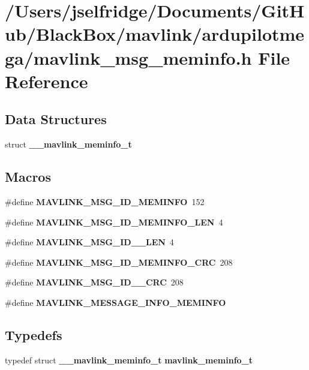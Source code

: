 \section{/\+Users/jselfridge/\+Documents/\+Git\+Hub/\+Black\+Box/mavlink/ardupilotmega/mavlink\+\_\+msg\+\_\+meminfo.h File Reference}
\label{mavlink__msg__meminfo_8h}
\subsection*{Data Structures}
\begin{DoxyCompactItemize}
\item 
struct \textbf{ \+\_\+\+\_\+mavlink\+\_\+meminfo\+\_\+t}
\end{DoxyCompactItemize}
\subsection*{Macros}
\begin{DoxyCompactItemize}
\item 
\#define \textbf{ M\+A\+V\+L\+I\+N\+K\+\_\+\+M\+S\+G\+\_\+\+I\+D\+\_\+\+M\+E\+M\+I\+N\+FO}~152
\item 
\#define \textbf{ M\+A\+V\+L\+I\+N\+K\+\_\+\+M\+S\+G\+\_\+\+I\+D\+\_\+\+M\+E\+M\+I\+N\+F\+O\+\_\+\+L\+EN}~4
\item 
\#define \textbf{ M\+A\+V\+L\+I\+N\+K\+\_\+\+M\+S\+G\+\_\+\+I\+D\+\_\+\_\+\+L\+EN}~4
\item 
\#define \textbf{ M\+A\+V\+L\+I\+N\+K\+\_\+\+M\+S\+G\+\_\+\+I\+D\+\_\+\+M\+E\+M\+I\+N\+F\+O\+\_\+\+C\+RC}~208
\item 
\#define \textbf{ M\+A\+V\+L\+I\+N\+K\+\_\+\+M\+S\+G\+\_\+\+I\+D\+\_\+\_\+\+C\+RC}~208
\item 
\#define \textbf{ M\+A\+V\+L\+I\+N\+K\+\_\+\+M\+E\+S\+S\+A\+G\+E\+\_\+\+I\+N\+F\+O\+\_\+\+M\+E\+M\+I\+N\+FO}
\end{DoxyCompactItemize}
\subsection*{Typedefs}
\begin{DoxyCompactItemize}
\item 
typedef struct \textbf{ \+\_\+\+\_\+mavlink\+\_\+meminfo\+\_\+t} \textbf{ mavlink\+\_\+meminfo\+\_\+t}
\end{DoxyCompactItemize}


